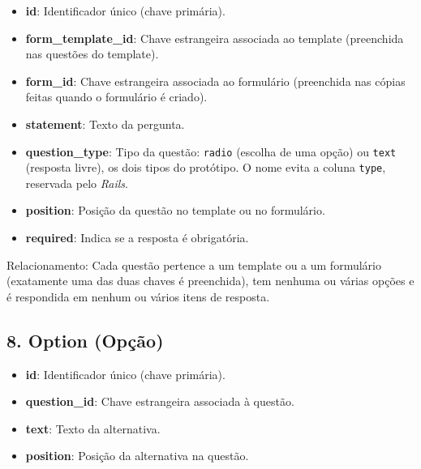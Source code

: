 \documentclass[a4paper,12pt]{article}
\begin{document}
\begin{itemize}

    \item \textbf{id}: Identificador único (chave primária).

    \item \textbf{form\_template\_id}: Chave estrangeira associada ao template (preenchida nas questões do template).

    \item \textbf{form\_id}: Chave estrangeira associada ao formulário (preenchida nas cópias feitas quando o formulário é criado).

    \item \textbf{statement}: Texto da pergunta.

    \item \textbf{question\_type}: Tipo da questão: \texttt{radio} (escolha de uma opção) ou \texttt{text} (resposta livre), os dois tipos do protótipo. O nome evita a coluna \texttt{type}, reservada pelo \textit{Rails}.

    \item \textbf{position}: Posição da questão no template ou no formulário.

    \item \textbf{required}: Indica se a resposta é obrigatória.

\end{itemize}

Relacionamento: Cada questão pertence a um template ou a um formulário (exatamente uma das duas chaves é preenchida), tem nenhuma ou várias opções e é respondida em nenhum ou vários itens de resposta.

\subsection*{8. Option (Opção)}

\begin{itemize}

    \item \textbf{id}: Identificador único (chave primária).

    \item \textbf{question\_id}: Chave estrangeira associada à questão.

    \item \textbf{text}: Texto da alternativa.

    \item \textbf{position}: Posição da alternativa na questão.

\end{itemize}
\end{document}
